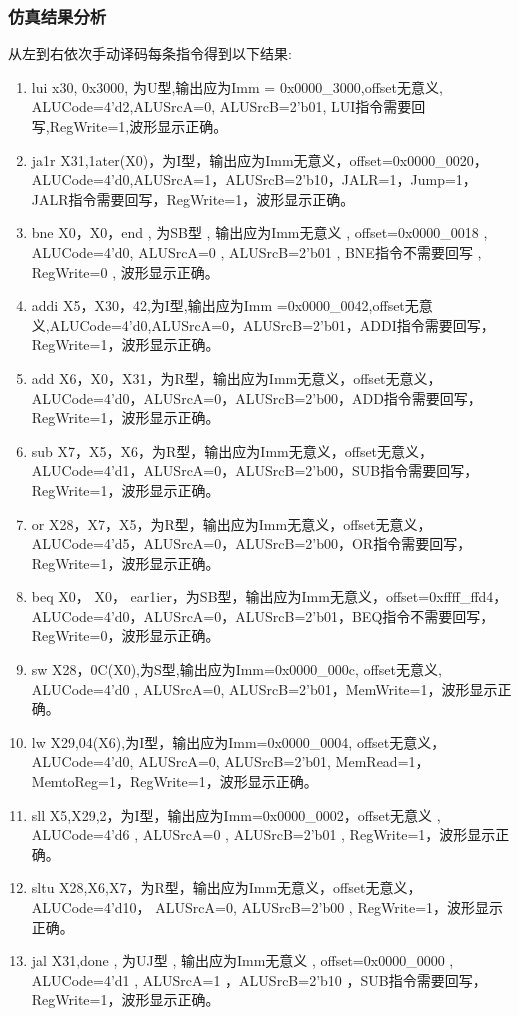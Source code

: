 \documentclass{../source/zjureport}
\begin{document}
            \subsubsection{仿真结果分析}
            从左到右依次手动译码每条指令得到以下结果:
            \begin{enumerate}
                \item lui x30, 0x3000, 为U型,输出应为Imm = 0x0000_3000,offset无意义, ALUCode=4'd2,ALUSrcA=0, ALUSrcB=2'b01, LUI指令需要回写,RegWrite=1,波形显示正确。
                \item ja1r X31,1ater(X0)，为I型，输出应为Imm无意义，offset=0x0000_0020，ALUCode=4'd0,ALUSrcA=1，ALUSrcB=2'b10，JALR=1，Jump=1，JALR指令需要回写，RegWrite=1，波形显示正确。
                \item bne X0，X0，end , 为SB型 , 输出应为Imm无意义 , offset=0x0000_0018 , ALUCode=4'd0,  ALUSrcA=0 , ALUSrcB=2'b01 , BNE指令不需要回写 , RegWrite=0 , 波形显示正确。
                \item addi X5，X30，42,为I型,输出应为Imm =0x0000_0042,offset无意义,ALUCode=4'd0,ALUSrcA=0，ALUSrcB=2'b01，ADDI指令需要回写，RegWrite=1，波形显示正确。
                \item add X6，X0，X31，为R型，输出应为Imm无意义，offset无意义，ALUCode=4'd0，ALUSrcA=0，ALUSrcB=2'b00，ADD指令需要回写，RegWrite=1，波形显示正确。
                \item sub X7，X5，X6，为R型，输出应为Imm无意义，offset无意义，ALUCode=4'd1，ALUSrcA=0，ALUSrcB=2'b00，SUB指令需要回写，RegWrite=1，波形显示正确。
                \item or X28，X7，X5，为R型，输出应为Imm无意义，offset无意义，ALUCode=4'd5，ALUSrcA=0，ALUSrcB=2'b00，OR指令需要回写，RegWrite=1，波形显示正确。
                \item beq X0， X0， ear1ier，为SB型，输出应为Imm无意义，offset=0xffff_ffd4，ALUCode=4'd0，ALUSrcA=0，ALUSrcB=2'b01，BEQ指令不需要回写，RegWrite=0，波形显示正确。
                \item sw X28，0C(X0),为S型,输出应为Imm=0x0000_000c, offset无意义, ALUCode=4'd0 , ALUSrcA=0, ALUSrcB=2'b01，MemWrite=1，波形显示正确。
                \item lw X29,04(X6),为I型，输出应为Imm=0x0000_0004, offset无意义，ALUCode=4'd0, ALUSrcA=0, ALUSrcB=2'b01, MemRead=1，MemtoReg=1，RegWrite=1，波形显示正确。
                \item sll X5,X29,2，为I型，输出应为Imm=0x0000_0002，offset无意义 , ALUCode=4'd6 , ALUSrcA=0 , ALUSrcB=2'b01 , RegWrite=1，波形显示正确。
                \item sltu X28,X6,X7，为R型，输出应为Imm无意义，offset无意义，ALUCode=4'd10， ALUSrcA=0, ALUSrcB=2'b00 , RegWrite=1，波形显示正确。
                \item jal X31,done , 为UJ型 , 输出应为Imm无意义 , offset=0x0000_0000 , ALUCode=4'd1 ,  ALUSrcA=1 ，ALUSrcB=2'b10 ，SUB指令需要回写，RegWrite=1，波形显示正确。
            \end{enumerate}
\end{document}
